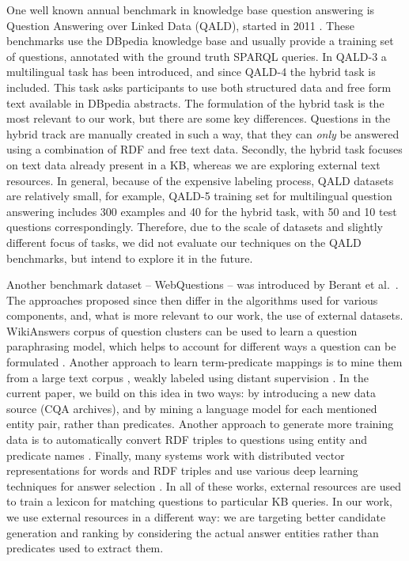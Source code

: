 One well known annual benchmark in knowledge base question answering is Question Answering over Linked Data (QALD), started in 2011 \cite{UngerFLNCCW15}.
These benchmarks use the DBpedia knowledge base and usually provide a training set of questions, annotated with the ground truth SPARQL queries.
In QALD-3 a multilingual task has been introduced, and since QALD-4 the hybrid task is included.
This task asks participants to use both structured data and free form text available in DBpedia abstracts.
The formulation of the hybrid task is the most relevant to our work, but there are some key differences.
Questions in the hybrid track are manually created in such a way, that they can \textit{only} be answered using a combination of RDF and free text data.
Secondly, the hybrid task focuses on text data already present in a KB, whereas we are exploring external text resources.
In general, because of the expensive labeling process, QALD datasets are relatively small, for example, QALD-5 training set for multilingual question answering includes 300 examples and 40 for the hybrid task, with 50 and 10 test questions correspondingly.
Therefore, due to the scale of datasets and slightly different focus of tasks, we did not evaluate our techniques on the QALD benchmarks, but intend to explore it in the future.

Another benchmark dataset -- WebQuestions -- was introduced by Berant et al.~\cite{Berant:EMNLP13}.
The approaches proposed since then differ in the algorithms used for various components, and, what is more relevant to our work, the use of external datasets.
WikiAnswers corpus of question clusters can be used to learn a question paraphrasing model, which helps to account for different ways a question can be formulated \cite{berant2014semantic}.
Another approach to learn term-predicate mappings is to mine them from a large text corpus \cite{yao2014information}, weakly labeled using distant supervision \cite{mintz2009distant}.
In the current paper, we build on this idea in two ways: by introducing a new data source (CQA archives), and by mining a language model for each mentioned entity pair, rather than predicates.
Another approach to generate more training data is to automatically convert RDF triples to questions using entity and predicate names \cite{BordesCW14:emnlp}.
Finally, many systems work with distributed vector representations for words and RDF triples and use various deep learning techniques for answer selection \cite{BordesCW14:emnlp,yih2015semantic}.
In all of these works, external resources are used to train a lexicon for matching questions to particular KB queries.
In our work, we use external resources in a different way: we are targeting better candidate generation and ranking by considering the actual answer entities rather than predicates used to extract them.

